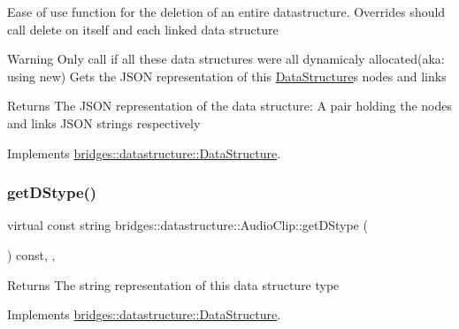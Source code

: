 Ease of use function for the deletion of an entire datastructure. Overrides should call delete on itself and each linked data structure

\begin{DoxyWarning}{Warning}
Only call if all these data structures were all dynamicaly allocated(aka\+: using new) Gets the J\+S\+ON representation of this \hyperlink{classbridges_1_1datastructure_1_1_data_structure}{Data\+Structure}\textquotesingle{}s nodes and links
\end{DoxyWarning}
\begin{DoxyReturn}{Returns}
The J\+S\+ON representation of the data structure\+: A pair holding the nodes and links J\+S\+ON strings respectively 
\end{DoxyReturn}


Implements \hyperlink{classbridges_1_1datastructure_1_1_data_structure}{bridges\+::datastructure\+::\+Data\+Structure}.

\mbox{\label{classbridges_1_1datastructure_1_1_audio_clip_a1fc853180a8d825b2e5ea2d8e3f8e810}} 
\subsubsection{\texorpdfstring{get\+D\+Stype()}{getDStype()}}
{\footnotesize\ttfamily virtual const string bridges\+::datastructure\+::\+Audio\+Clip\+::get\+D\+Stype (\begin{DoxyParamCaption}{ }\end{DoxyParamCaption}) const\hspace{0.3cm}{\ttfamily [inline]}, {\ttfamily [override]}, {\ttfamily [virtual]}}

\begin{DoxyReturn}{Returns}
The string representation of this data structure type 
\end{DoxyReturn}


Implements \hyperlink{classbridges_1_1datastructure_1_1_data_structure_a4ff66cb34409f11fe9fc647f6d8a22ce}{bridges\+::datastructure\+::\+Data\+Structure}.

\mbox{\label{classbridges_1_1datastructure_1_1_audio_clip_acc378f797b1b6e3cfb778c1ccdc23dba}} 
